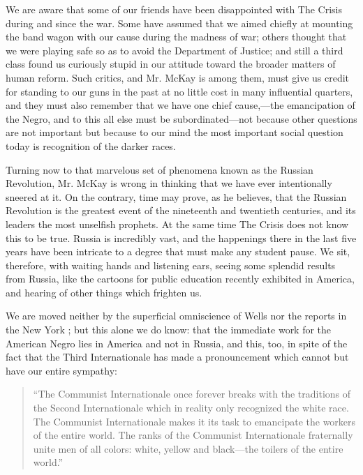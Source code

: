 \documentclass[letterpaper,10pt,english]{jupyterBook}
\begin{document}
\sphinxAtStartPar
We are aware that some of our friends have been disappointed with The Crisis during and since the war. Some have assumed that we aimed chiefly at mounting the band wagon with our cause during the madness of war; others thought that we were playing safe so as to avoid the Department of Justice; and still a third class found us curiously stupid in our attitude toward the broader matters of human reform. Such critics, and Mr. McKay is among them, must give us credit for standing to our guns in the past at no little cost in many influential quarters, and they must also remember that we have one chief cause,—the emancipation of the Negro, and to this all else must be subordinated—not because other questions are not important but because to our mind the most important social question today is recognition of the darker races.

\sphinxAtStartPar
Turning now to that marvelous set of phenomena known as the Russian Revolution, Mr. McKay is wrong in thinking that we have ever intentionally sneered at it. On the contrary, time may prove, as he believes, that the Russian Revolution is the greatest event of the nineteenth and twentieth centuries, and its leaders the most unselfish prophets. At the same time The Crisis does not know this to be true. Russia is incredibly vast, and the happenings there in the last five years have been intricate to a degree that must make any student pause. We sit, therefore, with waiting hands and listening ears, seeing some splendid results from Russia, like the cartoons for public education recently exhibited in America, and hearing of other things which frighten us.

\sphinxAtStartPar
We are moved neither by the superficial omniscience of Wells nor the reports in the New York ; but this alone we do know: that the immediate work for the American Negro lies in America and not in Russia, and this, too, in spite of the fact that the Third Internationale has made a pronouncement which cannot but have our entire sympathy:
\begin{quote}

\sphinxAtStartPar
“The Communist Internationale once forever breaks with the traditions of the Second Internationale which in reality only recognized the white race. The Communist Internationale makes it its task to emancipate the workers of the entire world. The ranks of the Communist Internationale fraternally unite men of all colors: white, yellow and black—the toilers of the entire world.”
\end{quote}
\end{document}
